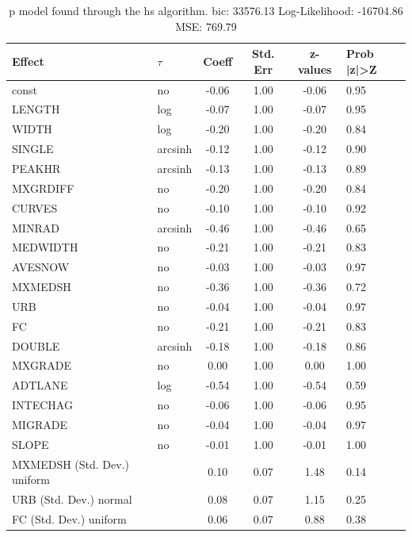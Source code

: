 \begin{table}
	\caption{p model found through the hs algorithm. bic: 33576.13 Log-Likelihood: -16704.86 MSE: 769.79}
	\begin{center}
		\begin{tabular}{|l|l|c|c|c|l|}
			\hline
			Effect & $\tau$ & Coeff & Std. Err & z-values & Prob |z|>Z \\
			\hline
			const & no & -0.06 & 1.00 & -0.06 & 0.95 \\
			\hline
			LENGTH & log & -0.07 & 1.00 & -0.07 & 0.95 \\
			\hline
			WIDTH & log & -0.20 & 1.00 & -0.20 & 0.84 \\
			\hline
			SINGLE & arcsinh & -0.12 & 1.00 & -0.12 & 0.90 \\
			\hline
			PEAKHR & arcsinh & -0.13 & 1.00 & -0.13 & 0.89 \\
			\hline
			MXGRDIFF & no & -0.20 & 1.00 & -0.20 & 0.84 \\
			\hline
			CURVES & no & -0.10 & 1.00 & -0.10 & 0.92 \\
			\hline
			MINRAD & arcsinh & -0.46 & 1.00 & -0.46 & 0.65 \\
			\hline
			MEDWIDTH & no & -0.21 & 1.00 & -0.21 & 0.83 \\
			\hline
			AVESNOW & no & -0.03 & 1.00 & -0.03 & 0.97 \\
			\hline
			MXMEDSH & no & -0.36 & 1.00 & -0.36 & 0.72 \\
			\hline
			URB & no & -0.04 & 1.00 & -0.04 & 0.97 \\
			\hline
			FC & no & -0.21 & 1.00 & -0.21 & 0.83 \\
			\hline
			DOUBLE & arcsinh & -0.18 & 1.00 & -0.18 & 0.86 \\
			\hline
			MXGRADE & no & 0.00 & 1.00 & 0.00 & 1.00 \\
			\hline
			ADTLANE & log & -0.54 & 1.00 & -0.54 & 0.59 \\
			\hline
			INTECHAG & no & -0.06 & 1.00 & -0.06 & 0.95 \\
			\hline
			MIGRADE & no & -0.04 & 1.00 & -0.04 & 0.97 \\
			\hline
			SLOPE & no & -0.01 & 1.00 & -0.01 & 1.00 \\
			\hline
			MXMEDSH (Std. Dev.) uniform &  & 0.10 & 0.07 & 1.48 & 0.14 \\
			\hline
			URB (Std. Dev.) normal &  & 0.08 & 0.07 & 1.15 & 0.25 \\
			\hline
			FC (Std. Dev.) uniform &  & 0.06 & 0.07 & 0.88 & 0.38 \\

\end{tabular}
\end{center}
\end{table}

